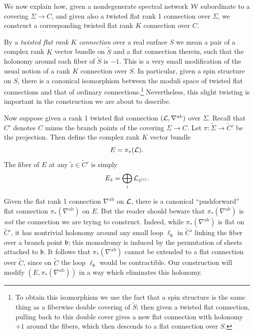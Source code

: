 \documentclass[11pt,a4paper]{article}
\def\CL {{\cal L}}
\def\wnet {{\cal W}}
\def\ab{{\mathrm{ab}}}
\def\tz{{\tilde z}}
\newcommand{\ti}[1]{\textit{#1}}
\def\fb{\mathfrak{b}}
\def\CL {{\cal L}}
\def\wnet {{\cal W}}
\begin{document}
We now explain how, given a nondegenerate spectral network $\wnet$ subordinate
to a covering $\Sigma \to C$, and given also a
twisted flat rank 1 connection over $\Sigma$, we
construct a corresponding twisted flat rank $K$ connection over $C$.

By a \ti{twisted flat rank $K$ connection}
over a real surface $S$ we mean a pair of a complex rank $K$ vector bundle
on $\tilde S$ and a flat connection therein, such that the
holonomy around each fiber of $\tilde S$ is $-1$.
This is a very small modification of the usual notion of a rank $K$ connection over $S$.
In particular, given a spin structure on $S$, there is a canonical
isomorphism between the moduli space of twisted flat connections and that
of ordinary connections.\footnote{To obtain this isomorphism we use the fact that
a spin structure is the same thing as a fiberwise double covering of $\tilde S$;
then given a twisted flat connection, pulling back to this double cover gives a new flat
connection with holonomy $+1$ around the fibers, which then descends to a flat connection
over $S$.}
Nevertheless, this slight twisting is important
in the construction we are about to describe.

Now suppose given a rank 1 twisted flat connection $(\CL,\nabla^\ab)$ over $\Sigma$.
Recall that $C'$ denotes $C$ minus the branch points of the covering $\Sigma \to C$.  Let
$\pi: \tilde \Sigma \to \tilde C'$ be the projection.  Then define the complex
rank $K$ vector bundle
\begin{equation}
 E = \pi_*(\CL).
\end{equation}
The fiber of $E$ at any $\tz \in \tilde C'$ is simply
\begin{equation}\label{eq:simple-pushforward}
E_{\tz} = \bigoplus_i \CL_{\tz^{(i)}}.
\end{equation}

Given the flat rank 1 connection $\nabla^\ab$ on $\CL$,
there is a canonical ``pushforward'' flat connection $\pi_*(\nabla^\ab)$ on $E$.
But the reader should beware that $\pi_*(\nabla^\ab)$  is \ti{not} the connection
we are trying to construct.  Indeed, while $\pi_*(\nabla^\ab)$ is flat on $\tilde C'$,
it has nontrivial holonomy around any small loop $\ell_\fb$ in $\tilde C'$ linking
the fiber over a branch point $\fb$; this monodromy is
induced by the permutation of sheets attached to $\fb$.
It follows that $\pi_*(\nabla^\ab)$ cannot be extended
to a flat connection over $\tilde C$, since on $\tilde C$ the loop $\ell_\fb$ would
be contractible.
Our construction will modify $(E, \pi_*(\nabla^\ab))$ in a way
which eliminates this holonomy.
\end{document}
